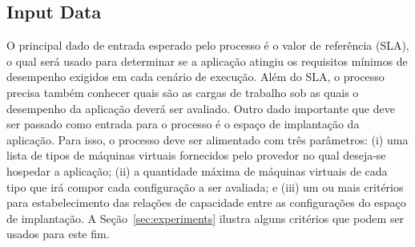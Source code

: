 \documentclass[10pt,conference,compsocconf]{IEEEtran}
\begin{document}
%
%


\subsection{Input Data}

O principal dado de entrada esperado pelo processo é o valor de referência (SLA), o qual será usado para determinar 
se a aplicação atingiu os requisitos mínimos de desempenho exigidos em cada cenário de execução. Além do SLA, o processo precisa também conhecer quais são as cargas de trabalho sob as quais o desempenho da aplicação deverá ser avaliado. Outro dado importante que deve ser passado como entrada para o processo é o espaço de implantação da aplicação. Para isso, o processo deve ser alimentado com três parâmetros: (i) uma lista de tipos de máquinas virtuais fornecidos pelo provedor no qual deseja-se hospedar a aplicação; (ii) a quantidade máxima de máquinas virtuais de cada tipo que irá compor cada configuração a ser avaliada; e (iii) um ou mais critérios para estabelecimento das relações de capacidade entre as configurações do espaço de implantação. A Seção~\ref{sec:experiments} ilustra alguns critérios que podem ser usados para este fim. 
\end{document}
